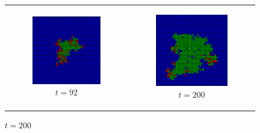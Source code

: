 \begin{figure}
\begin{center}
	\begin{tabular}{c c}
		\begin{subfigure}[b]{0.4\textwidth}
			\centering
			\includegraphics[width=.6\textwidth, angle=0]{./../shared/fig/spatial/SIR_spatial_52x52_92time.png}
			\caption{$t = 92$}
			\label{fig:sir_spatial_92}
		\end{subfigure}

		& 

		\begin{subfigure}[b]{0.4\textwidth}
			\centering
			\includegraphics[width=.6\textwidth, angle=0]{./../shared/fig/spatial/SIR_spatial_52x52_200time.png}
			\caption{$t = 200$}
			\label{fig:sir_spatial_200}
		\end{subfigure}

		\\
		

\end{tabular}
\end{center}
\end{figure}
